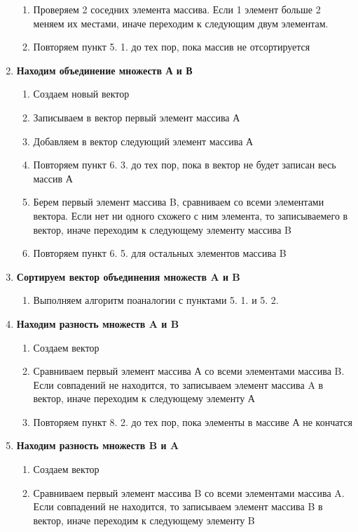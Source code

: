 \documentclass[]{article}
\begin{document}
\begin{enumerate}[1.]
		\begin{enumerate}[{5}. 1.]
		\item Проверяем 2 соседних элемента массива. Если 1 элемент больше 2 меняем их местами, иначе переходим к следующим двум элементам.
		\item Повторяем пункт 5. 1.  до тех пор, пока массив не отсортируется
		\end{enumerate}
		\item \textbf{Находим объединение множеств А и В}
		\begin{enumerate}[{6}. 1.]
		\item Создаем новый вектор
		\item Записываем в вектор первый элемент массива А
		\item Добавляем в вектор следующий элемент массива А
		\item Повторяем пункт 6. 3. до тех пор, пока в вектор не будет записан весь массив А
		\item Берем первый элемент массива B, сравниваем со всеми элементами вектора. Если нет ни одного схожего с ним элемента, то записываемего в вектор, иначе переходим к следующему элементу массива B
		\item Повторяем пункт 6. 5. для остальных элементов массива B
		\end{enumerate}
		\item \textbf{Сортируем вектор объединения множеств A и B}
		\begin{enumerate}[{7}. 1.]
		\item Выполняем алгоритм поаналогии с пунктами 5. 1. и 5. 2.
		\end{enumerate}
		\item \textbf{Находим разность множеств A и B}
		\begin{enumerate}[{8}. 1.]
		\item Создаем вектор
		\item Сравниваем первый элемент массива А со всеми элементами массива B. Если совпадений не находится, то записываем элемент массива A в вектор, иначе переходим к следующему элементу А
		\item Повторяем пункт 8. 2. до тех пор, пока элементы в массиве А не кончатся
		\end{enumerate}
		\item \textbf{Находим разность множеств B и A}
		\begin{enumerate}[{9}. 1.]
			\item Создаем вектор
			\item Сравниваем первый элемент массива B со всеми элементами массива A. Если совпадений не находится, то записываем элемент массива B в вектор, иначе переходим к следующему элементу B

\end{enumerate}
\end{enumerate}
\end{document}
